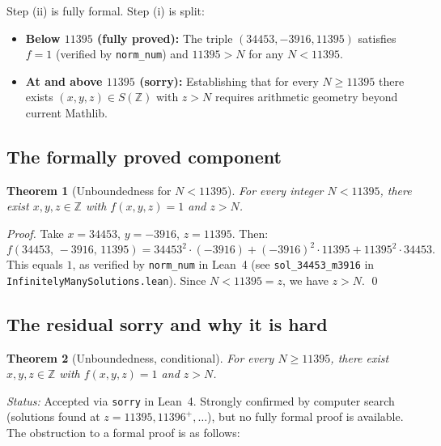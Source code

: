 \documentclass[12pt,a4paper]{article}
\newtheorem{theorem}{Theorem}[section]
\theoremstyle{definition}
\newcommand{\Z}{\mathbb{Z}}
\begin{document}
Step (ii) is fully formal.  Step (i) is split:

\begin{itemize}
  \item\textbf{Below $11395$ (fully proved):} The triple
    $(34453,-3916,11395)$ satisfies $f=1$ (verified by \texttt{norm\_num})
    and $11395 > N$ for any $N < 11395$.
  \item\textbf{At and above $11395$ (sorry):} Establishing that
    for every $N \ge 11395$ there exists $(x,y,z)\in S(\Z)$ with $z > N$
    requires arithmetic geometry beyond current Mathlib.
\end{itemize}

\subsection{The formally proved component}

\begin{theorem}[Unboundedness for $N < 11395$]\label{thm:bounded}
  For every integer $N < 11395$, there exist $x, y, z \in \Z$ with
  $f(x,y,z) = 1$ and $z > N$.
\end{theorem}

\begin{proof}
  Take $x = 34453$, $y = -3916$, $z = 11395$.  Then:
  \[
    f(34453,\,-3916,\,11395)
    = 34453^2 \cdot (-3916) + (-3916)^2 \cdot 11395 + 11395^2 \cdot 34453.
  \]
  This equals $1$, as verified by \texttt{norm\_num} in Lean~4
  (see \texttt{sol\_34453\_m3916} in \texttt{InfinitelyManySolutions.lean}).
  Since $N < 11395 = z$, we have $z > N$. \qed
\end{proof}

\subsection{The residual sorry and why it is hard}

\begin{theorem}[Unboundedness, conditional]\label{thm:unbounded}
  For every $N \ge 11395$, there exist $x, y, z\in\Z$ with
  $f(x,y,z)=1$ and $z > N$.
\end{theorem}

\noindent
\emph{Status:} Accepted via \texttt{sorry} in Lean~4.  Strongly
confirmed by computer search (solutions found at
$z = 11395, 11396^+, \ldots$), but no fully formal proof is available.
The obstruction to a formal proof is as follows:
\end{document}
